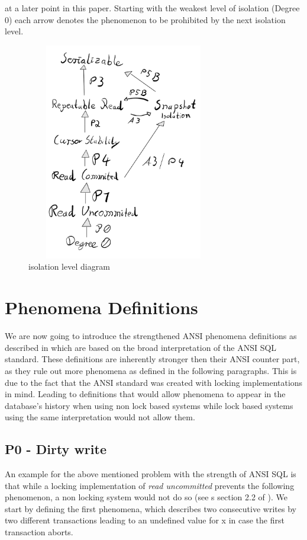 \documentclass[sigconf, review=false]{acmart}
\begin{document}
at a later point in this paper. Starting with the weakest level of isolation (Degree 0) each arrow denotes the phenomenon to be prohibited
by the next isolation level.
\begin{figure}[H]
    \includegraphics[width=8.5cm, height=9.5cm]{iso_lvl_dia.png}
    \caption{isolation level diagram}
\end{figure}
\section{Phenomena Definitions}
We are now going to introduce the strengthened ANSI phenomena definitions as described in \cite{Adya_Liskov_O_Neil_2000} which
are based on the broad interpretation of the ANSI SQL standard. These definitions are inherently stronger then their ANSI counter part,
as they rule out more phenomena as defined in the following paragraphs. This is due to the fact that the ANSI standard
was created with locking implementations in mind. Leading to definitions that would allow phenomena to appear in the database's history when using non lock based systems
while lock based systems using the same interpretation would not allow them.

\subsection{P0 - Dirty write}
An example for the above mentioned problem with the strength of ANSI SQL is that while a locking implementation of \emph{read uncommitted}
prevents the following phenomenon, a non locking system would not do so (see s
section 2.2 of \cite{Adya_Liskov_O_Neil_2000}).
We start by defining the first phenomena, which describes two consecutive writes by two different
transactions leading to an undefined value for x in case the first transaction aborts.
\end{document}
